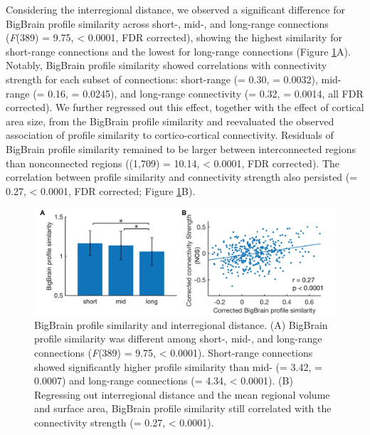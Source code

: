 \begin{refsection}
Considering the interregional distance, we observed a significant difference for BigBrain profile similarity across short-, mid-, and long-range connections (\textit{F}(389) = 9.75, \pval < 0.0001, FDR corrected), showing the highest similarity for short-range connections and the lowest for long-range connections (Figure \ref{bigbrainFig3}A). Notably, BigBrain profile similarity showed correlations with connectivity strength for each subset of connections: short-range (\rval = 0.30, \pval = 0.0032), mid-range (\rval = 0.16, \pval = 0.0245), and long-range connectivity (\rval = 0.32, \pval = 0.0014, all FDR corrected). We further regressed out this effect, together with the effect of cortical area size, from the BigBrain profile similarity and reevaluated the observed association of profile similarity to cortico-cortical connectivity. Residuals of BigBrain profile similarity remained to be larger between interconnected regions than nonconnected regions (\tvaldf(1,709) = 10.14, \pval < 0.0001, FDR corrected). The correlation between profile similarity and connectivity strength also persisted (\rval = 0.27, \pval < 0.0001, FDR corrected; Figure \ref{bigbrainFig3}B).

\begin{figure}[h]
    \centering
    \includegraphics[width=\linewidth]{images/thesis_bb_fig3.jpg}
    \caption{BigBrain profile similarity and interregional distance. (A) BigBrain profile similarity was different among short-, mid-, and long-range connections (\textit{F}(389) = 9.75, \pval < 0.0001). Short-range connections showed significantly higher profile similarity than mid- (\tval = 3.42, \pval = 0.0007) and long-range connections (\tval = 4.34, \pval < 0.0001). (B) Regressing out interregional distance and the mean regional volume and surface area, BigBrain profile similarity still correlated with the connectivity strength (\rval = 0.27, \pval < 0.0001).}
    \label{bigbrainFig3}
\end{figure}


\end{refsection}
